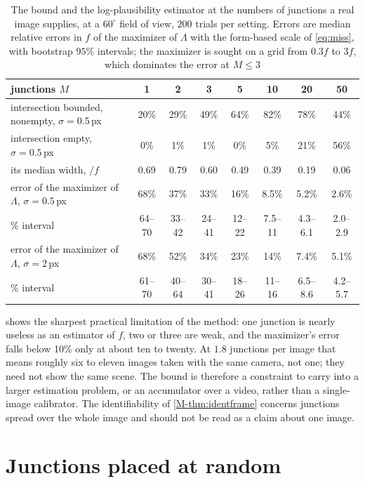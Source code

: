 \begin{table}[t]
\centering\footnotesize
\caption{The bound and the log-plausibility estimator at the numbers of junctions a real image supplies, at a $60^\circ$ field of view, $200$ trials per setting. Errors are median relative errors in $f$ of the maximizer of $\Lambda$ with the form-based scale of \eqref{eq:miss}, with bootstrap $95\%$ intervals; the maximizer is sought on a grid from $0.3f$ to $3f$, which dominates the error at $M\le3$}
\label{tab:lowcount}
\begin{tabular}{lccccccc}
\toprule
junctions $M$ & 1 & 2 & 3 & 5 & 10 & 20 & 50\\
\midrule
intersection bounded, nonempty, $\sigma=0.5$\,px & 20\% & 29\% & 49\% & 64\% & 82\% & 78\% & 44\%\\
intersection empty, $\sigma=0.5$\,px & 0\% & 1\% & 1\% & 0\% & 5\% & 21\% & 56\%\\
its median width, $/f$ & 0.69 & 0.79 & 0.60 & 0.49 & 0.39 & 0.19 & 0.06\\
error of the maximizer of $\Lambda$, $\sigma=0.5$\,px & 68\% & 37\% & 33\% & 16\% & 8.5\% & 5.2\% & 2.6\%\\
\quad 95\% interval & 64--70 & 33--42 & 24--41 & 12--22 & 7.5--11 & 4.3--6.1 & 2.0--2.9\\
error of the maximizer of $\Lambda$, $\sigma=2$\,px & 68\% & 52\% & 34\% & 23\% & 14\% & 7.4\% & 5.1\%\\
\quad 95\% interval & 61--70 & 40--64 & 30--41 & 18--26 & 11--16 & 6.5--8.6 & 4.2--5.7\\
\bottomrule
\end{tabular}
\end{table}

 shows the sharpest practical limitation of the method: one junction is nearly useless as an estimator of $f$, two or three are weak, and the maximizer's error falls below 10\% only at about ten to twenty. At $1.8$ junctions per image that means roughly six to eleven images taken with the same camera, not one; they need not show the same scene. The bound is therefore a constraint to carry into a larger estimation problem, or an accumulator over a video, rather than a single-image calibrator. The identifiability of \cref{M-thm:identframe} concerns junctions spread over the whole image and should not be read as a claim about one image.

\section{Junctions placed at random}\label{sec:Srandomall}

